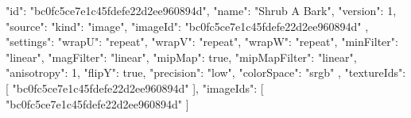 {
  "id": "bc0fc5ce7e1c45fdefe22d2ee960894d",
  "name": "Shrub A Bark",
  "version": 1,
  "source": {
    "kind": "image",
    "imageId": "bc0fc5ce7e1c45fdefe22d2ee960894d"
  },
  "settings": {
    "wrapU": "repeat",
    "wrapV": "repeat",
    "wrapW": "repeat",
    "minFilter": "linear",
    "magFilter": "linear",
    "mipMap": true,
    "mipMapFilter": "linear",
    "anisotropy": 1,
    "flipY": true,
    "precision": "low",
    "colorSpace": "srgb"
  },
  "textureIds": [
    "bc0fc5ce7e1c45fdefe22d2ee960894d"
  ],
  "imageIds": [
    "bc0fc5ce7e1c45fdefe22d2ee960894d"
  ]
}
